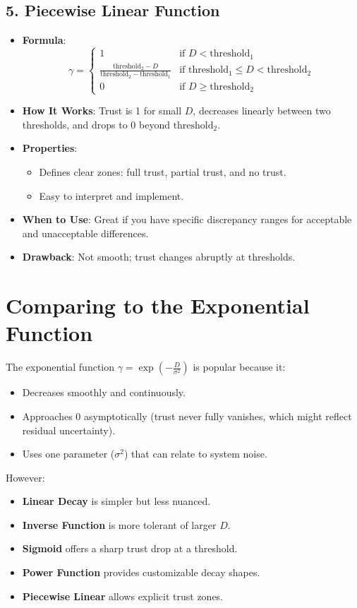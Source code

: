 \documentclass{article}
\begin{document}
\subsection*{5. Piecewise Linear Function}
\begin{itemize}
    \item \textbf{Formula}:
    \[
    \gamma = 
    \begin{cases} 
    1 & \text{if } D < \text{threshold}_1 \\
    \frac{\text{threshold}_2 - D}{\text{threshold}_2 - \text{threshold}_1} & \text{if } \text{threshold}_1 \leq D < \text{threshold}_2 \\
    0 & \text{if } D \geq \text{threshold}_2 
    \end{cases}
    \]
    \item \textbf{How It Works}: Trust is 1 for small \(D\), decreases linearly between two thresholds, and drops to 0 beyond \(\text{threshold}_2\).
    \item \textbf{Properties}:
    \begin{itemize}
        \item Defines clear zones: full trust, partial trust, and no trust.
        \item Easy to interpret and implement.
    \end{itemize}
    \item \textbf{When to Use}: Great if you have specific discrepancy ranges for acceptable and unacceptable differences.
    \item \textbf{Drawback}: Not smooth; trust changes abruptly at thresholds.
\end{itemize}

\section*{Comparing to the Exponential Function}
The exponential function \(\gamma = \exp\left(-\frac{D}{\sigma^2}\right)\) is popular because it:
\begin{itemize}
    \item Decreases smoothly and continuously.
    \item Approaches 0 asymptotically (trust never fully vanishes, which might reflect residual uncertainty).
    \item Uses one parameter (\(\sigma^2\)) that can relate to system noise.
\end{itemize}

However:
\begin{itemize}
    \item \textbf{Linear Decay} is simpler but less nuanced.
    \item \textbf{Inverse Function} is more tolerant of larger \(D\).
    \item \textbf{Sigmoid} offers a sharp trust drop at a threshold.
    \item \textbf{Power Function} provides customizable decay shapes.
    \item \textbf{Piecewise Linear} allows explicit trust zones.
\end{itemize}
\end{document}
